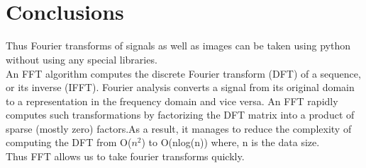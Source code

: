 \documentclass[11pt]{article}
\begin{document}
    \begin{center}
    \end{center}
    { \hspace*{\fill} \\}
    
    \begin{center}
    \end{center}
    { \hspace*{\fill} \\}
    
    \hypertarget{conclusions}{%
\section{Conclusions}\label{conclusions}}

Thus Fourier transforms of signals as well as images can be taken using
python without using any special libraries.\\ An FFT algorithm computes
the discrete Fourier transform (DFT) of a sequence, or its inverse
(IFFT). Fourier analysis converts a signal from its original domain to a
representation in the frequency domain and vice versa. An FFT rapidly
computes such transformations by factorizing the DFT matrix into a
product of sparse (mostly zero) factors.As a result, it manages to
reduce the complexity of computing the DFT from O(\(n^2\)) to O(nlog(n))
where, n is the data size.\\ Thus FFT allows us to take fourier transforms
quickly.


    
    
    
    
\end{document}
